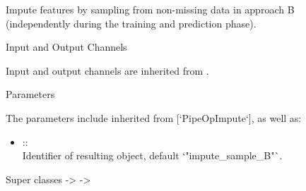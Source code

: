 \documentclass[letterpaper]{book}
\begin{document}
%
\begin{Description}\relax
Impute features by sampling from non-missing data in approach B (independently during the training and prediction phase).
\end{Description}
%
\begin{Section}{Input and Output Channels}

Input and output channels are inherited from .
\end{Section}
%
\begin{Section}{Parameters}

The parameters include inherited from [`PipeOpImpute`], as well as: \\{}
\begin{itemize}

\item{}  :: \\{}
Identifier of resulting object, default `"impute\_sample\_B"`.

\end{itemize}

\end{Section}
%
\begin{Section}{Super classes}
 ->  -> 
\end{Section}
%
\end{document}
